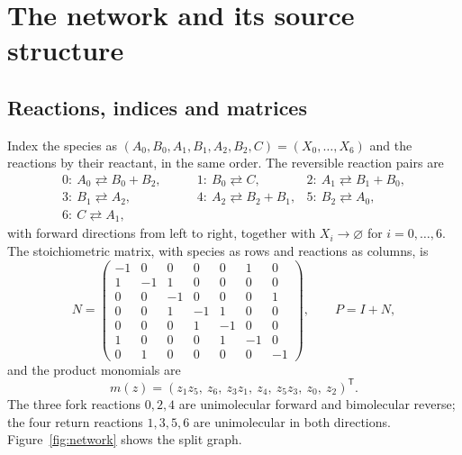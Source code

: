 \documentclass[11pt,a4paper]{article}
\theoremstyle{plain}
\theoremstyle{definition}
\theoremstyle{remark}
\numberwithin{equation}{section}
\begin{document}
\section{The network and its source structure}\label{sec:network}

\subsection{Reactions, indices and matrices}
Index the species as $(A_0,B_0,A_1,B_1,A_2,B_2,C)=(X_0,\dots,X_6)$ and the reactions by their reactant, in the same order. The reversible reaction pairs are
\begin{equation}\label{eq:reactions}
\begin{array}{lll}
0\colon\ A_0\rightleftarrows B_0+B_2,\qquad& 1\colon\ B_0\rightleftarrows C,\qquad& 2\colon\ A_1\rightleftarrows B_1+B_0,\\
3\colon\ B_1\rightleftarrows A_2,& 4\colon\ A_2\rightleftarrows B_2+B_1,& 5\colon\ B_2\rightleftarrows A_0,\\
6\colon\ C\rightleftarrows A_1,&&
\end{array}
\end{equation}
with forward directions from left to right, together with $X_i\to\varnothing$ for $i=0,\dots,6$. The stoichiometric matrix, with species as rows and reactions as columns, is
\begin{equation}\label{eq:N}
N=\begin{pmatrix}
-1&0&0&0&0&1&0\\
1&-1&1&0&0&0&0\\
0&0&-1&0&0&0&1\\
0&0&1&-1&1&0&0\\
0&0&0&1&-1&0&0\\
1&0&0&0&1&-1&0\\
0&1&0&0&0&0&-1
\end{pmatrix},\qquad P=I+N,
\end{equation}
and the product monomials are
\begin{equation}\label{eq:monomials}
m(z)=(z_1z_5,\ z_6,\ z_3z_1,\ z_4,\ z_5z_3,\ z_0,\ z_2)^{\mathsf T}.
\end{equation}
The three fork reactions $0,2,4$ are unimolecular forward and bimolecular reverse; the four return reactions $1,3,5,6$ are unimolecular in both directions. Figure~\ref{fig:network} shows the split graph.
\end{document}

